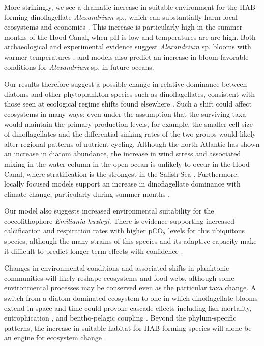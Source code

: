 \documentclass[11pt]{article}
\begin{document}
\begin{linenumbers}
More strikingly, we see a dramatic increase in suitable environment for the HAB-forming dinoflagellate \textit{Alexandrium} sp., which can substantially harm local ecosystems \cite{colin2002latitudinal} and economies \cite{anderson2000estimated}. This increase is particularly high in the summer months of the Hood Canal, when pH is low and temperatures are are high. Both archaeological and experimental evidence suggest \textit{Alexandrium} sp. blooms with warmer temperatures \cite{mudie2002palynological}, and models \cite{moore2015present} also predict an increase in bloom-favorable conditions for \textit{Alexandrium} sp. in future oceans. 

 Our results therefore suggest a possible change in relative dominance between diatoms and other phytoplankton species such as dinoflagellates, consistent with those seen at ecological regime shifts found elsewhere \cite{wasmund2017diatom, hinder2012changes}. Such a shift could affect ecosystems in many ways; even under the assumption that the surviving taxa would maintain the primary production levels, for example, the smaller cell-size of dinoflagellates and the differential sinking rates of the two groups would likely alter regional patterns of nutrient cycling\cite{xiao2018warming, anderson2002harmful, bienfang1984sinking}. Although the north Atlantic has shown an increase in diatom abundance\cite{hinder2012changes}, the increase in wind stress and associated mixing in the water column in the open ocean is unlikely to occur in the Hood Canal, where stratification is the strongest in the Salish Sea \cite{moore2008descriptive}. Furthermore, locally focused models support an increase in dinoflagellate dominance with climate change, particularly during summer months \cite{khangaonkar2019salish}.
 
 Our model also suggests increased environmental suitability for the coccolithophore \textit{Emiliania huxleyi}. There is evidence supporting increased calcification and respiration rates with higher pCO$_2$ levels \cite{iglesias2008phytoplankton} for this ubiquitous species, although the many strains of this species and its adaptive capacity make it difficult to predict longer-term effects with confidence \cite{bolton2016decrease}. 
 
 Changes in environmental conditions and associated shifts in planktonic communities will likely reshape ecosystems and food webs, although some environmental processes may be conserved even as the particular taxa change. A switch from a diatom-dominated ecosystem to one in which dinoflagellate blooms extend in space and time could provoke cascade effects \cite{xiao2018warming} including fish mortality, eutrophication \cite{anderson2002harmful}, and bentho-pelagic coupling \citep[][]{bienfang1984sinking}. Beyond the phylum-specific patterns, the increase in suitable habitat for HAB-forming species will alone be an engine for ecosystem change \cite{trainer2019pelagic, wells2018harmful}.
  

\end{linenumbers}
\end{document}
